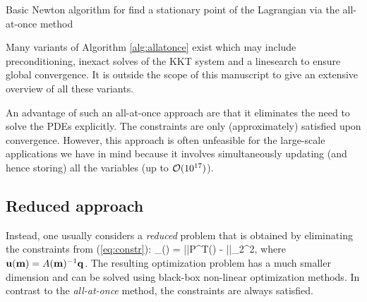 \documentclass{iopart}
\begin{document}
\begin{algorithm}
\caption{Basic Newton algorithm for find a stationary point of the Lagrangian via the all-at-once method}
\label{alg:allatonce}
\begin{algorithmic}
\ENDWHILE
\end{algorithmic}
\end{algorithm}


Many variants of Algorithm \ref{alg:allatonce} exist which may include preconditioning, inexact solves of the KKT system 
and a linesearch to ensure global convergence.
It is outside the scope of this manuscript to give an extensive overview of all these variants.


An advantage of such an all-at-once approach are that it eliminates the need to
solve the PDEs explicitly. The constraints are only (approximately) satisfied upon convergence.
However, this approach is often unfeasible
for the large-scale applications we have in mind because it involves simultaneously updating
(and hence storing) all the variables (up to $\mathcal{O}(10^{17})$). 


\subsection{Reduced approach}
Instead, one usually considers a \emph{reduced} problem that is obtained by eliminating the constraints from (\ref{eq:constr}):
\bq
\min_{}\phi() = ||P^T() - ||_2^2,
\label{eq:redL}
\eq
where $\mathbf{u}(\mathbf{m}) = A(\mathbf{m})^{-1}\mathbf{q}$.
The resulting optimization problem has a much smaller dimension and can be solved using black-box 
non-linear optimization methods. In contrast to the \emph{all-at-once} method, the constraints are always satisfied.
\end{document}
